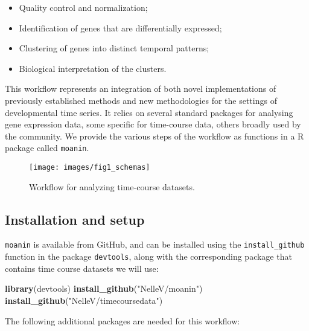 \documentclass[9pt,a4paper,]{extarticle}
\newenvironment{Shaded}{\begin{snugshade}}{\end{snugshade}}
\newcommand{\KeywordTok}[1]{\textcolor[rgb]{0.13,0.29,0.53}{\textbf{#1}}}
\newcommand{\NormalTok}[1]{#1}
\newcommand{\StringTok}[1]{\textcolor[rgb]{0.31,0.60,0.02}{#1}}
\begin{document}
\begin{itemize}
\tightlist
\item
  Quality control and normalization;
\item
  Identification of genes that are differentially expressed;
\item
  Clustering of genes into distinct temporal patterns;
\item
  Biological interpretation of the clusters.
\end{itemize}

This workflow represents an integration of both novel implementations of
previously established methods and new methodologies for the settings of
developmental time series. It relies on several standard packages for
analysing gene expression data, some specific for time-course data, others
broadly used by the community. We provide the various steps of the workflow as
functions in a R package called \texttt{moanin}.

\begin{figure}[H]

{\centering \texttt{[image: images/fig1\_schemas]} 

}

\caption{Workflow for analyzing time-course datasets.}\label{fig:schema}
\end{figure}

\hypertarget{installation-and-setup}{%
\subsection{Installation and setup}\label{installation-and-setup}}

\texttt{moanin} is available from GitHub, and can be installed using the \texttt{install\_github} function in the package \texttt{devtools}, along with the corresponding package that contains time course datasets we will use:

\begin{Shaded}
\begin{Highlighting}[]
\KeywordTok{library}\NormalTok{(devtools)}
\KeywordTok{install_github}\NormalTok{(}\StringTok{"NelleV/moanin"}\NormalTok{)}
\KeywordTok{install_github}\NormalTok{(}\StringTok{"NelleV/timecoursedata"}\NormalTok{)}
\end{Highlighting}
\end{Shaded}

The following additional packages are needed for this workflow:
\end{document}
